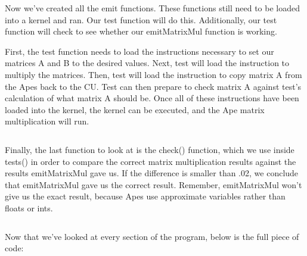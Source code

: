 \documentclass[10pt]{article}
\begin{document}
Now we’ve created all the emit functions.  These functions still need to be loaded into a kernel and ran.  Our test function will do this.  Additionally, our test function will check to see whether our emitMatrixMul function is working. \par 
    First, the test function needs to load the instructions necessary to set our matrices A and B to the desired values.  Next, test will load the instruction to multiply the matrices.  Then, test will load the instruction to copy matrix A from the Apes back to the CU.  Test can then prepare to check matrix A against test’s calculation of what matrix A should be. Once all of these instructions have been loaded into the kernel, the kernel can be executed, and the Ape matrix multiplication will run. \par

    \inputminted{c}{mm-tests.c}

    Finally, the last function to look at is the check() function, which we use inside tests() in order to compare the correct matrix multiplication results against the results emitMatrixMul gave us.  If the difference is smaller than .02, we conclude that emitMatrixMul gave us the correct result.  Remember, emitMatrixMul won’t give us the exact result, because Apes use approximate variables rather than floats or ints. \par

    \inputminted{c}{mm-check.c}

    Now that we’ve looked at every section of the program, below is the full piece of code: \par
\end{document}
